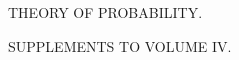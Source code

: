 \thispagestyle{empty}
\vspace*{.27\textheight}
\begin{center}
{\Large THEORY OF PROBABILITY.}\par\bigskip
SUPPLEMENTS TO VOLUME IV.
\end{center}
\clearpage
